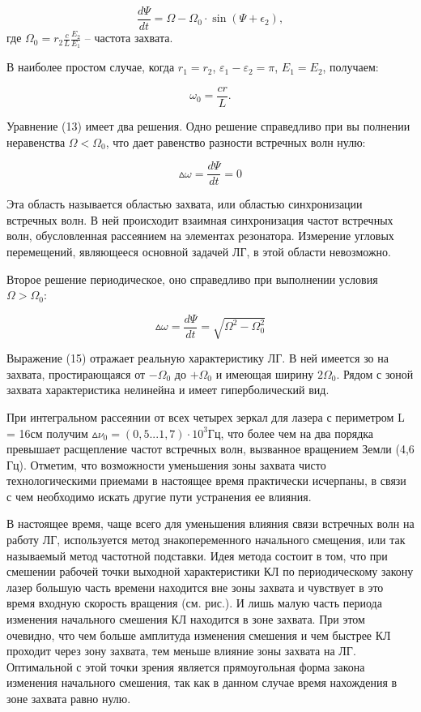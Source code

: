 \documentclass[a4paper,12pt]{article} %
\begin{document}
\begin{equation}
    \frac {d\Psi} {dt} = \Omega - \Omega_0 \cdot \sin(\Psi + \epsilon_2),
\end{equation}
где $\Omega_0 = r_2 \frac{c}{L} \frac{E_2}{E_1}$ -- частота захвата.

В наиболее простом случае, когда $r_1 = r_2$, $\varepsilon_1 - \varepsilon_2 = \pi$, $E_1 = E_2$, получаем:

\begin{equation}
    \omega_0 = \frac {cr} {L}.
\end{equation}

Уравнение (13) имеет два решения. Одно решение справедливо при вы полнении неравенства $\Omega < \Omega_0$, что дает равенство разности встречных волн нулю:

\begin{equation*}
    \vartriangle \! \! \omega = \frac {d\Psi} {dt} = 0
\end{equation*}

Эта область называется областью захвата, или областью синхронизации
встречных волн. В ней происходит взаимная синхронизация частот встречных
волн, обусловленная рассеянием на элементах резонатора. Измерение угловых
перемещений, являющееся основной задачей ЛГ, в этой области невозможно.

Второе решение периодическое, оно справедливо при выполнении условия $\Omega > \Omega_0$:

\begin{equation}
    \vartriangle \! \! \omega = \frac {d\Psi} {dt} = \sqrt{\Omega^2 - \Omega_0^2}
\end{equation}

Выражение (15) отражает реальную характеристику ЛГ. В ней имеется зо на захвата, простирающаяся от $-\Omega_0$ до $+\Omega_0$ и имеющая ширину $2\Omega_0$.
Рядом с зоной захвата характеристика нелинейна и имеет гиперболический вид.

При интегральном рассеянии от всех четырех зеркал для лазера с периметром L = 16см получим $\vartriangle \! \! \nu_0 = (0,5 ... 1,7) \cdot 10^3 \text{Гц}$, что более чем на два порядка превышает расщепление частот встречных волн, вызванное вращением Земли (4,6 Гц). Отметим, что возможности уменьшения зоны захвата
чисто технологическими приемами в настоящее время практически исчерпаны, в связи с чем необходимо искать другие пути устранения ее влияния.

В настоящее время, чаще всего для уменьшения влияния связи встречных
волн на работу ЛГ, используется метод знакопеременного начального смещения, или так называемый метод частотной подставки. Идея метода состоит в
том, что при смешении рабочей точки выходной характеристики КЛ по периодическому закону лазер большую часть времени находится вне зоны захвата и
чувствует в это время входную скорость вращения (см. рис.). И лишь малую
часть периода изменения начального смешения КЛ находится в зоне захвата.
При этом очевидно, что чем больше амплитуда изменения смешения и чем
быстрее КЛ проходит через зону захвата, тем меньше влияние зоны захвата на
ЛГ. Оптимальной с этой точки зрения является прямоугольная форма закона
изменения начального смешения, так как в данном случае время нахождения в
зоне захвата равно нулю.
\end{document}
